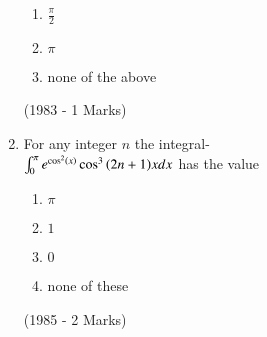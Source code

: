 \documentclass[journal,12pt,twocolumn]{IEEEtran}
\theoremstyle{remark}
\begin{document}
\begin{enumerate}
\begin{enumerate}
		\item$\frac{\pi}{2}$
			\item$\pi$
		\item none of the above
		         \end{enumerate}
		\hfill{(1983 - 1 Marks)}
	\item For any integer $n$ the integral-\\
		$\int_0^{\pi} e^{\cos^2 \left(x\right)} \cos ^3 {\left(2n+1\right)}xdx$ has the value
                        \begin{enumerate}
			\item	$\pi$
			\item $1$
			\item $0$
			\item none of these
		        \end{enumerate}
		\hfill{(1985 - 2 Marks)}
\end{enumerate}
\end{document}
